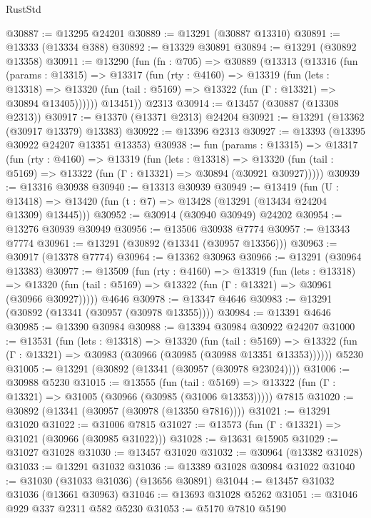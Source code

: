 \begin{lexlean}{RustStd}
\begin{coremodule}
@30887 := @13295 @24201
@30889 := @13291 (@30887 @13310)
@30891 := @13333 (@13334 @388)
@30892 := @13329 @30891
@30894 := @13291 (@30892 @13358)
@30911 := @13290
    (fun (fn : @705) =>
    @30889
      (@13313
        (@13316
          (fun (params : @13315) =>
          @13317
            (fun (rty : @4160) =>
            @13319
              (fun (lets : @13318) =>
              @13320 (fun (tail : @5169) => @13322 (fun (Γ : @13321) => @30894 @13405))))))
        @13451))
    @2313
@30914 := @13457 (@30887 (@13308 @2313))
@30917 := @13370 (@13371 @2313) @24204
@30921 := @13291 (@13362 (@30917 @13379) @13383)
@30922 := @13396 @2313
@30927 := @13393 (@13395 @30922 @24207 @13351 @13353)
@30938 := fun (params : @13315) =>
  @13317
    (fun (rty : @4160) =>
    @13319
      (fun (lets : @13318) =>
      @13320 (fun (tail : @5169) => @13322 (fun (Γ : @13321) => @30894 (@30921 @30927)))))
@30939 := @13316 @30938
@30940 := @13313 @30939
@30949 := @13419
    (fun (U : @13418) => @13420 (fun (t : @7) => @13428 (@13291 (@13434 @24204 @13309) @13445)))
@30952 := @30914 (@30940 @30949) @24202
@30954 := @13276 @30939 @30949
@30956 := @13506 @30938 @7774
@30957 := @13343 @7774
@30961 := @13291 (@30892 (@13341 (@30957 @13356)))
@30963 := @30917 (@13378 @7774)
@30964 := @13362 @30963
@30966 := @13291 (@30964 @13383)
@30977 := @13509
    (fun (rty : @4160) =>
    @13319
      (fun (lets : @13318) =>
      @13320 (fun (tail : @5169) => @13322 (fun (Γ : @13321) => @30961 (@30966 @30927)))))
    @4646
@30978 := @13347 @4646
@30983 := @13291 (@30892 (@13341 (@30957 (@30978 @13355))))
@30984 := @13391 @4646
@30985 := @13390 @30984
@30988 := @13394 @30984 @30922 @24207
@31000 := @13531
    (fun (lets : @13318) =>
    @13320
      (fun (tail : @5169) =>
      @13322 (fun (Γ : @13321) => @30983 (@30966 (@30985 (@30988 @13351 @13353))))))
    @5230
@31005 := @13291 (@30892 (@13341 (@30957 (@30978 @23024))))
@31006 := @30988 @5230
@31015 := @13555
    (fun (tail : @5169) => @13322 (fun (Γ : @13321) => @31005 (@30966 (@30985 (@31006 @13353)))))
    @7815
@31020 := @30892 (@13341 (@30957 (@30978 (@13350 @7816))))
@31021 := @13291 @31020
@31022 := @31006 @7815
@31027 := @13573 (fun (Γ : @13321) => @31021 (@30966 (@30985 @31022)))
@31028 := @13631 @15905
@31029 := @31027 @31028
@31030 := @13457 @31020
@31032 := @30964 (@13382 @31028)
@31033 := @13291 @31032
@31036 := @13389 @31028 @30984 @31022
@31040 := @31030 (@31033 @31036) (@13656 @30891)
@31044 := @13457 @31032 @31036 (@13661 @30963)
@31046 := @13693 @31028 @5262
@31051 := @31046 @929 @337 @2311 @582 @5230
@31053 := @5170 @7810 @5190

\end{coremodule}
\end{lexlean}
